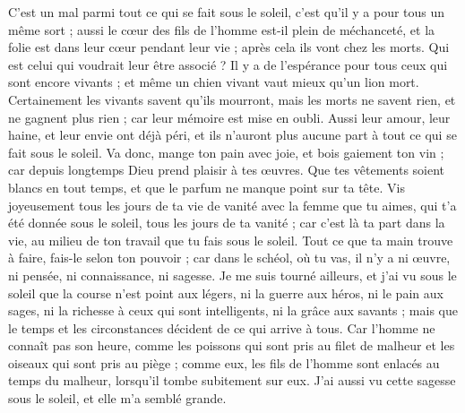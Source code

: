 \begin{multicols}{2}
C'est un mal parmi tout ce qui se fait sous le soleil, c'est qu'il y a pour tous un même sort ; aussi le cœur des fils de l'homme est-il plein de méchanceté, et la folie est dans leur cœur pendant leur vie ; après cela ils vont chez les morts. Qui est celui qui voudrait leur être associé ?
Il y a de l'espérance pour tous ceux qui sont encore vivants ; et même un chien vivant vaut mieux qu'un lion mort.
Certainement les vivants savent qu'ils mourront, mais les morts ne savent rien, et ne gagnent plus rien ; car leur mémoire est mise en oubli. 
Aussi leur amour, leur haine, et leur envie ont déjà péri, et ils n'auront plus aucune part à tout ce qui se fait sous le soleil.
Va donc, mange ton pain avec joie, et bois gaiement ton vin ; car depuis longtemps Dieu prend plaisir à tes œuvres.
Que tes vêtements soient blancs en tout temps, et que le parfum ne manque point sur ta tête. 
Vis joyeusement tous les jours de ta vie de vanité avec la femme que tu aimes, qui t'a été donnée sous le soleil, tous les jours de ta vanité ; car c'est là ta part dans la vie, au milieu de ton travail que tu fais sous le soleil.
Tout ce que ta main trouve à faire, fais-le selon ton pouvoir ; car dans le schéol, où tu vas, il n'y a ni œuvre, ni pensée, ni connaissance, ni sagesse.
Je me suis tourné ailleurs, et j'ai vu sous le soleil que la course n'est point aux légers, ni la guerre aux héros, ni le pain aux sages, ni la richesse à ceux qui sont intelligents, ni la grâce aux savants ; mais que le temps et les circonstances décident de ce qui arrive à tous.
Car l'homme ne connaît pas son heure, comme les poissons qui sont pris au filet de malheur et les oiseaux qui sont pris au piège ; comme eux, les fils de l'homme sont enlacés au temps du malheur, lorsqu'il tombe subitement sur eux.
J'ai aussi vu cette sagesse sous le soleil, et elle m'a semblé grande.

\end{multicols}

